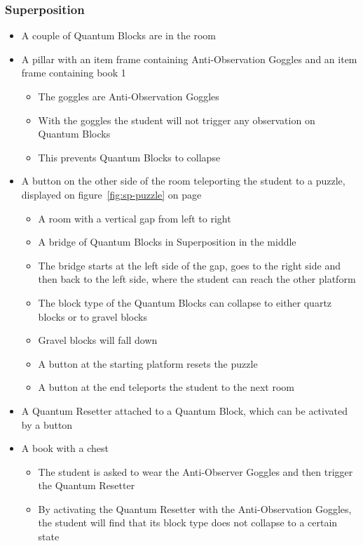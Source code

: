 \documentclass[11pt,twoside]{report} %
\begin{document}
\subsubsection{Superposition}

\begin{itemize}
	\item A couple of Quantum Blocks are in the room
	\item A pillar with an item frame containing Anti-Observation Goggles and an item frame containing book 1
	\begin{itemize}
		\item The goggles are Anti-Observation Goggles
		\item With the goggles the student will not trigger any observation on Quantum Blocks
		\item This prevents Quantum Blocks to collapse
	\end{itemize}
	\item A button on the other side of the room teleporting the student to a puzzle, displayed on figure~\ref{fig:sp-puzzle} on page~\pageref{fig:sp-puzzle}
	\begin{itemize}
		\item A room with a vertical gap from left to right
		\item A bridge of Quantum Blocks in Superposition in the middle
		\item The bridge starts at the left side of the gap, goes to the right side and then back to the left side, where the student can reach the other platform
		\item The block type of the Quantum Blocks can collapse to either quartz blocks or to gravel blocks
		\item Gravel blocks will fall down
		\item A button at the starting platform resets the puzzle
		\item A button at the end teleports the student to the next room
	\end{itemize}
	\item A Quantum Resetter attached to a Quantum Block, which can be activated by a button
	\item A book with a chest
	\begin{itemize}
		\item The student is asked to wear the Anti-Observer Goggles and then trigger the Quantum Resetter
		\item By activating the Quantum Resetter with the Anti-Observation Goggles, the student will find that its block type does not collapse to a certain state

\end{itemize}
\end{itemize}
\end{document}
